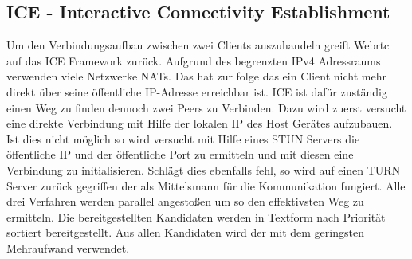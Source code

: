 \subsection{ICE - Interactive Connectivity Establishment}
Um den Verbindungsaufbau zwischen zwei Clients auszuhandeln greift Webrtc auf das ICE\cite{rfc-ice} Framework zurück. Aufgrund des begrenzten IPv4 Adressraums verwenden viele Netzwerke NATs. Das hat zur folge das ein Client nicht mehr direkt über seine öffentliche IP-Adresse erreichbar ist. ICE ist dafür zuständig einen Weg zu finden dennoch zwei Peers zu Verbinden. Dazu wird zuerst versucht eine direkte \pTp Verbindung mit Hilfe der lokalen IP des Host Gerätes aufzubauen. Ist dies nicht möglich so wird versucht mit Hilfe eines STUN Servers die öffentliche IP und der öffentliche Port zu ermitteln und mit diesen eine Verbindung zu initialisieren. Schlägt dies ebenfalls fehl, so wird auf einen TURN Server zurück gegriffen der als Mittelsmann für die Kommunikation fungiert. Alle drei Verfahren werden parallel angestoßen um so den effektivsten Weg zu ermitteln.  Die bereitgestellten Kandidaten werden in Textform nach Priorität sortiert bereitgestellt. Aus allen Kandidaten wird der mit dem geringsten Mehraufwand verwendet.


